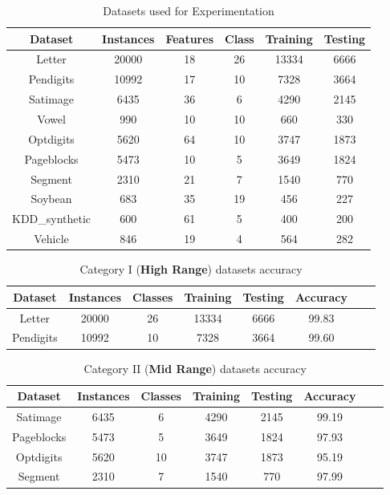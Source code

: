 \documentclass[a4paper, 10pt, conference]{ieeeconf}      %
\begin{document}
\begin{table}[h!]
  \centering
  \caption{Datasets used for Experimentation}
 
  \label{tab:table1}
  \begin{tabular}{|c|c|c|c|c|c|}
   \hline
   \textbf{Dataset} & \textbf{Instances}  & \textbf{Features} & \textbf{Class} 
   & \textbf{Training} & \textbf{Testing} \\
   \hline
   Letter & 20000 & 18 & 26  & 13334 & 6666 \\
    \hline
   Pendigits &10992 & 17 & 10 & 7328 & 3664\\
    \hline
   Satimage & 6435  & 36 & 6 & 4290 & 2145\\
   \hline
   Vowel & 990  & 10 & 10 & 660 & 330\\
   \hline
   Optdigits & 5620 & 64 & 10  & 3747 & 1873\\
   \hline
   Pageblocks & 5473 & 10 & 5 & 3649 & 1824\\
   \hline
   Segment & 2310 & 21 & 7 & 1540 & 770 \\
   \hline
   Soybean & 683  & 35 & 19 & 456 & 227\\
   \hline 
   KDD\_synthetic & 600 & 61 & 5 & 400 & 200\\
   \hline
   Vehicle & 846 & 19 & 4 & 564 & 282 \\
   \hline
  \end{tabular}
\end{table}

\begin{table}[h!]
  \centering
  \caption{Category I (\textbf{High Range}) datasets accuracy}
  \label{tab:table2}
   \begin{tabular}{|c|c|c|c|c|c|c|c|}
   \hline
   \textbf{Dataset} & \textbf{Instances} & \textbf{Classes} & \textbf{Training} & \textbf{Testing} & \textbf{Accuracy}\\
   \hline
   Letter & 20000 & 26  & 13334 & 6666 & 99.83\\
    \hline
   Pendigits &10992 & 10 & 7328 & 3664 & 99.60 \\
    \hline
  \end{tabular}
\end{table}

\begin{table}[h!]
  \centering
  \caption{Category II (\textbf{Mid Range}) datasets accuracy}
  
  \label{tab:table3}
   \begin{tabular}{|c|c|c|c|c|c|c|c|}
   \hline
   \textbf{Dataset} & \textbf{Instances} & \textbf{Classes} & \textbf{Training} & \textbf{Testing} & \textbf{Accuracy}\\
   \hline
   Satimage & 6435 & 6 & 4290 & 2145 & 99.19\\
   \hline
   Pageblocks & 5473 & 5 & 3649 & 1824 & 97.93 \\
   \hline
   Optdigits & 5620 & 10  & 3747 & 1873 & 95.19 \\
   \hline
   Segment & 2310 & 7 & 1540 & 770 & 97.99\\
   \hline
  \end{tabular}
\end{table}
  
\end{document}
